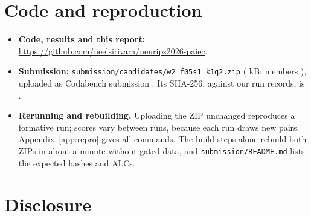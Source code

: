 \documentclass{article}
\newcommand{\codeurl}{\url{https://github.com/neelsirivara/neurips2026-paiec}}
\begin{document}
\section{Code and reproduction}
\label{sec:repro}

\begin{itemize}
\item \textbf{Code, results and this report:} \codeurl.
\item \textbf{Submission:} \texttt{submission/candidates/w2\_f05s1\_k1q2.zip} (\SubZipKB{} kB; members \SubMembers), uploaded as Codabench submission \SubId. Its SHA-256, \SubShaVerified{} against our run records, is {\footnotesize\texttt{\SubZipSha}}.
\item \textbf{Rerunning and rebuilding.} Uploading the ZIP unchanged reproduces a formative run; scores vary between runs, because each run draws new pairs. Appendix~\ref{app:repro} gives all commands. The build steps alone rebuild both ZIPs in about a minute without gated data, and \texttt{submission/README.md} lists the expected hashes and ALCs.
\end{itemize}

\section{Disclosure}
\label{sec:disclosure}
\end{document}
